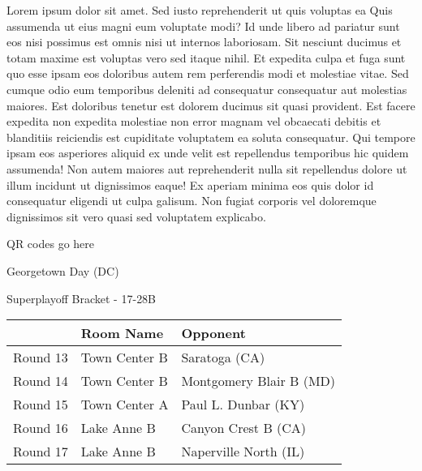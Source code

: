 \documentclass{article}%
\begin{document}
\vspace*{8pt}%
\linebreak%
\newline%
\newline%
Lorem ipsum dolor sit amet. Sed iusto reprehenderit ut quis voluptas ea Quis assumenda ut eius magni eum voluptate modi? Id unde libero ad pariatur sunt eos nisi possimus est omnis nisi ut internos laboriosam. Sit nesciunt ducimus et totam maxime est voluptas vero sed itaque nihil. Et expedita culpa et fuga sunt quo esse ipsam eos doloribus autem rem perferendis modi et molestiae vitae.\newline%
\newline%
Sed cumque odio eum temporibus deleniti ad consequatur consequatur aut molestias maiores. Est doloribus tenetur est dolorem ducimus sit quasi provident. Est facere expedita non expedita molestiae non error magnam vel obcaecati debitis et blanditiis reiciendis est cupiditate voluptatem ea soluta consequatur. Qui tempore ipsam eos asperiores aliquid ex unde velit est repellendus temporibus hic quidem assumenda!\newline%
\newline%
Non autem maiores aut reprehenderit nulla sit repellendus dolore ut illum incidunt ut dignissimos eaque! Ex aperiam minima eos quis dolor id consequatur eligendi ut culpa galisum. Non fugiat corporis vel doloremque dignissimos sit vero quasi sed voluptatem explicabo.\newline%
\newline%
%
\vspace*{30pt}%
\begin{center}%
\begin{Huge}%
QR codes go here%
\end{Huge}%
\end{center}%
\newpage%
\begin{center}%
\begin{Huge}%
Georgetown Day (DC)%
\end{Huge}%
\vspace*{8pt}%
\linebreak%
\begin{Large}%
Superplayoff Bracket {-} 17{-}28B%
\end{Large}%
\end{center}%
%
\begin{tabularx}{\textwidth}{|c|Y|Y|}%
\hline%
&Room Name&Opponent\\%
\hline%
Round 13&Town Center B&Saratoga (CA)\\%
Round 14&Town Center B&Montgomery Blair B (MD)\\%
Round 15&Town Center A&Paul L. Dunbar (KY)\\%
Round 16&Lake Anne B&Canyon Crest B (CA)\\%
Round 17&Lake Anne B&Naperville North (IL)\\%
\hline%
\end{tabularx}%
\end{document}
